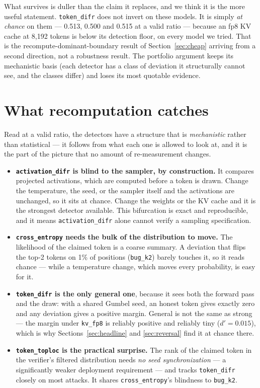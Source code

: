 \documentclass[11pt]{article}
\newcommand{\td}{\texttt{token\_difr}}
\newcommand{\ce}{\texttt{cross\_entropy}}
\newcommand{\ad}{\texttt{activation\_difr}}
\newcommand{\tl}{\texttt{token\_toploc}}
\begin{document}
What survives is duller than the claim it replaces, and we think it is the more
useful statement. \td{} does not invert on these models. It is simply \emph{at
chance} on them --- 0.513, 0.500 and 0.515 at a valid ratio --- because an fp8 KV
cache at 8{,}192 tokens is below its detection floor, on every model we tried. That
is the recompute-dominant-boundary result of Section~\ref{sec:cheap} arriving from a
second direction, not a robustness result. The portfolio argument keeps its
mechanistic basis (each detector has a class of deviation it structurally cannot
see, and the classes differ) and loses its most quotable evidence.

\section{What recomputation catches}
\label{sec:catch}

Read at a valid ratio, the detectors have a structure that is \emph{mechanistic}
rather than statistical --- it follows from what each one is allowed to look at, and
it is the part of the picture that no amount of re-measurement changes.

\begin{itemize}
\item \textbf{\ad{} is blind to the sampler, by construction.} It compares projected
activations, which are computed before a token is drawn. Change the temperature, the
seed, or the sampler itself and the activations are unchanged, so it sits at chance.
Change the weights or the KV cache and it is the strongest detector available. This
bifurcation is exact and reproducible, and it means \ad{} alone cannot verify a
sampling specification.
\item \textbf{\ce{} needs the bulk of the distribution to move.} The likelihood of
the claimed token is a coarse summary. A deviation that flips the top-2 tokens on 1\%
of positions (\texttt{bug\_k2}) barely touches it, so it reads chance --- while a
temperature change, which moves every probability, is easy for it.
\item \textbf{\td{} is the only general one}, because it sees both the forward pass
and the draw: with a shared Gumbel seed, an honest token gives exactly zero and any
deviation gives a positive margin. General is not the same as strong --- the margin
under \texttt{kv\_fp8} is reliably positive and reliably tiny ($d' = 0.015$), which
is why Sections~\ref{sec:headline} and \ref{sec:reversal} find it at chance there.
\item \textbf{\tl{} is the practical surprise.} The rank of the claimed token in the
verifier's filtered distribution needs \emph{no seed synchronization} --- a
significantly weaker deployment requirement --- and tracks \td{} closely on most
attacks. It shares \ce{}'s blindness to \texttt{bug\_k2}.
\end{itemize}
\end{document}
